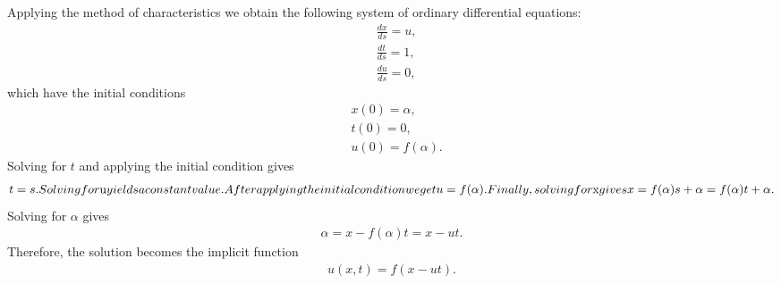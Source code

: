 Applying the method of characteristics we obtain the following system of ordinary differential equations:
\begin{subequations}
\begin{align}
  &\frac{dx}{ds} = u, \\
  &\frac{dt}{ds} = 1, \\
  &\frac{du}{ds} = 0,
\end{align}
\end{subequations}
which have the initial conditions
\begin{subequations}
\begin{align}
  &x(0) = \alpha, \\
  &t(0) = 0, \\
  &u(0) = f(\alpha) .
\end{align}
\end{subequations}
Solving for $t$ and applying the initial condition gives
\begin{subequations}
\begin{align}
  t = s .
\end{align}
Solving for $u$ yields a constant value. After applying the initial condition we get
\begin{align}
  u = f(\alpha) .
\end{align}
Finally, solving for $x$ gives
\begin{align}
  x = f(\alpha) s + \alpha = f(\alpha) t + \alpha .
\end{align}
\end{subequations}
Solving for $\alpha$ gives
\begin{align}
  \alpha = x - f(\alpha) t = x - u t .
\end{align}
Therefore, the solution becomes the implicit function
\begin{align}
  u(x,t) = f(x - u t ) .
\end{align}

